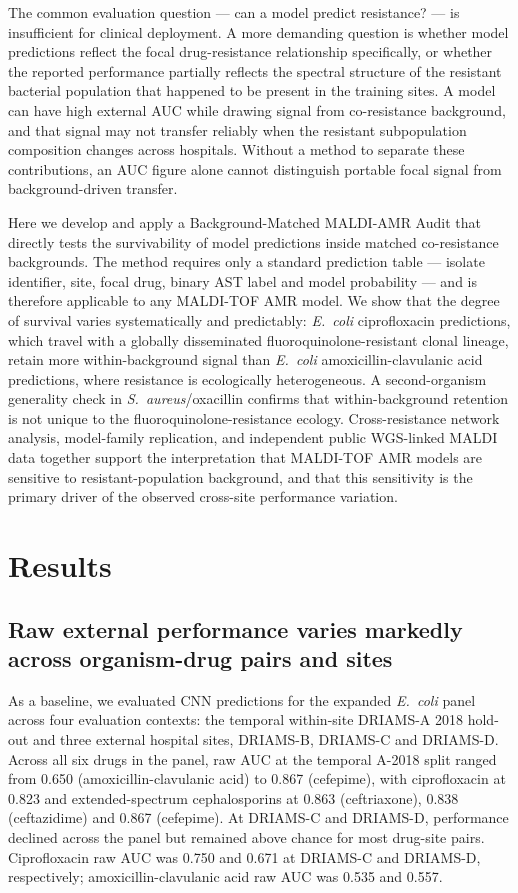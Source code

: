 \documentclass[11pt]{article}
\begin{document}
The common evaluation question --- can a model predict resistance? --- is insufficient for clinical deployment. A more demanding question is whether model predictions reflect the focal drug-resistance relationship specifically, or whether the reported performance partially reflects the spectral structure of the resistant bacterial population that happened to be present in the training sites. A model can have high external AUC while drawing signal from co-resistance background, and that signal may not transfer reliably when the resistant subpopulation composition changes across hospitals. Without a method to separate these contributions, an AUC figure alone cannot distinguish portable focal signal from background-driven transfer.

Here we develop and apply a Background-Matched MALDI-AMR Audit that directly tests the survivability of model predictions inside matched co-resistance backgrounds. The method requires only a standard prediction table --- isolate identifier, site, focal drug, binary AST label and model probability --- and is therefore applicable to any MALDI-TOF AMR model. We show that the degree of survival varies systematically and predictably: \textit{E.~coli} ciprofloxacin predictions, which travel with a globally disseminated fluoroquinolone-resistant clonal lineage, retain more within-background signal than \textit{E.~coli} amoxicillin-clavulanic acid predictions, where resistance is ecologically heterogeneous. A second-organism generality check in \textit{S.~aureus}/oxacillin confirms that within-background retention is not unique to the fluoroquinolone-resistance ecology. Cross-resistance network analysis, model-family replication, and independent public WGS-linked MALDI data together support the interpretation that MALDI-TOF AMR models are sensitive to resistant-population background, and that this sensitivity is the primary driver of the observed cross-site performance variation.

\section*{Results}

\subsection*{Raw external performance varies markedly across organism-drug pairs and sites}

As a baseline, we evaluated CNN predictions for the expanded \textit{E.~coli} panel across four evaluation contexts: the temporal within-site DRIAMS-A 2018 hold-out and three external hospital sites, DRIAMS-B, DRIAMS-C and DRIAMS-D. Across all six drugs in the panel, raw AUC at the temporal A-2018 split ranged from 0.650 (amoxicillin-clavulanic acid) to 0.867 (cefepime), with ciprofloxacin at 0.823 and extended-spectrum cephalosporins at 0.863 (ceftriaxone), 0.838 (ceftazidime) and 0.867 (cefepime). At DRIAMS-C and DRIAMS-D, performance declined across the panel but remained above chance for most drug-site pairs. Ciprofloxacin raw AUC was 0.750 and 0.671 at DRIAMS-C and DRIAMS-D, respectively; amoxicillin-clavulanic acid raw AUC was 0.535 and 0.557.
\end{document}
